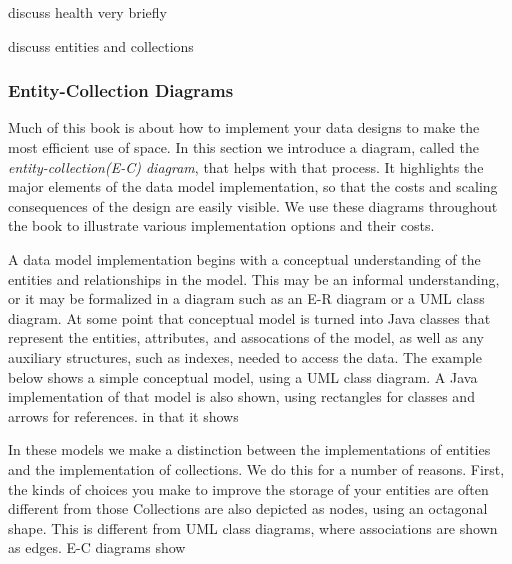 discuss health very briefly

discuss entities and collections

\subsubsection{Entity-Collection Diagrams}

Much of this book is about how to implement your data designs to make the most
efficient use of space. In this section we introduce a diagram, called the
\emph{entity-collection(E-C) diagram}, that helps with that process. It
highlights the major elements of the data model implementation, so that the
costs and scaling consequences of the design are easily visible. We use these
diagrams throughout the book to illustrate various implementation options and
their costs.

A data model implementation begins with a conceptual understanding of the
entities and relationships in the model.  This may be an informal understanding,
or it may be formalized in a diagram such as an E-R diagram or a UML class
diagram.  At some point that conceptual model is turned into Java classes that
represent the entities, attributes, and assocations of the model, as well as any
auxiliary structures, such as indexes, needed to access the data.  The example
below shows a simple conceptual model, using a UML class diagram.  A Java
implementation of that model is also shown, using rectangles for classes and
arrows for references.  %
in that it shows


In these models we make a distinction between the implementations of entities
and the implementation of collections.  We do this for a number of reasons. 
First, the kinds of choices you make to improve the storage of your entities are
often different from those Collections are also depicted as nodes, using an
octagonal shape.  This is different from UML class diagrams, where associations
are shown as edges. E-C diagrams show


